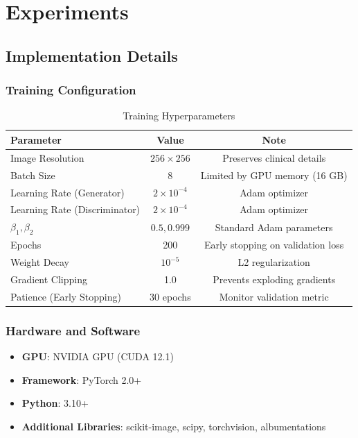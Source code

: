 \documentclass[10pt,conference,letterpaper]{IEEEtran}
\begin{document}
\section{Experiments}
\label{sec:experiments}

\subsection{Implementation Details}

\subsubsection{Training Configuration}

\begin{table}[H]
  \centering
  \caption{Training Hyperparameters}
  \begin{tabular}{lcc}
    \toprule
    \textbf{Parameter} & \textbf{Value} & \textbf{Note} \\
    \midrule
    Image Resolution & $256 \times 256$ & Preserves clinical details \\
    Batch Size & 8 & Limited by GPU memory (16 GB) \\
    Learning Rate (Generator) & $2 \times 10^{-4}$ & Adam optimizer \\
    Learning Rate (Discriminator) & $2 \times 10^{-4}$ & Adam optimizer \\
    $\beta_1, \beta_2$ & $0.5, 0.999$ & Standard Adam parameters \\
    Epochs & 200 & Early stopping on validation loss \\
    Weight Decay & $10^{-5}$ & L2 regularization \\
    Gradient Clipping & 1.0 & Prevents exploding gradients \\
    Patience (Early Stopping) & 30 epochs & Monitor validation metric \\
    \bottomrule
  \end{tabular}
\end{table}

\subsubsection{Hardware and Software}

\begin{itemize}
  \item \textbf{GPU}: NVIDIA GPU (CUDA 12.1)
  \item \textbf{Framework}: PyTorch 2.0+
  \item \textbf{Python}: 3.10+
  \item \textbf{Additional Libraries}: scikit-image, scipy, torchvision, albumentations
\end{itemize}
\end{document}
